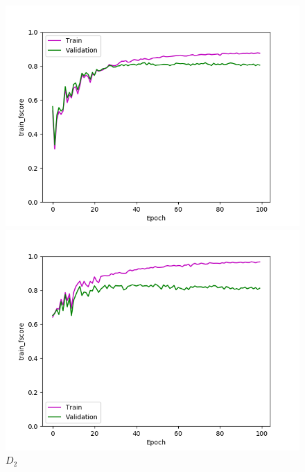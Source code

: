 \def\year{2017}\relax \documentclass[letterpaper]{article}
\begin{document}
\begin{figure}
\centering
\begin{minipage}{.24\textwidth}
  \centering
\includegraphics[width=\textwidth]{pics/d1_train_fscore_best_train_test.png}
\caption{$D_1$}\label{fig:d1fscoretraintest}
\end{minipage}
\begin{minipage}{.01\textwidth}
\end{minipage}
\begin{minipage}{.24\textwidth}
  \centering
\includegraphics[width=\textwidth]{pics/d2_train_fscore_best_train_test.png}
\caption{$D_2$}\label{fig:d2fscoretraintest}
\end{minipage}

\end{figure}
\end{document}
